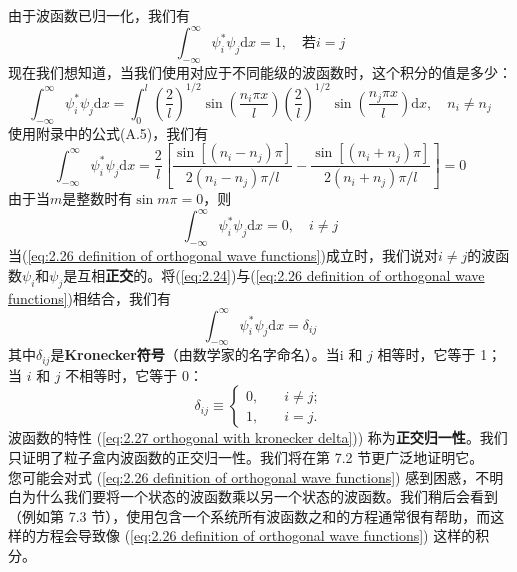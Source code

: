 	由于波函数已归一化，我们有
	\begin{equation}
		\int_{-\infty}^{\infty}\psi_i^{\ast} \psi_j \mathrm{d}x = 1, \quad \text{若}i=j
		\label{eq:2.24}
	\end{equation}
	现在我们想知道，当我们使用对应于不同能级的波函数时，这个积分的值是多少：
	\begin{equation*}
		\int_{-\infty}^{\infty}\psi_i^{\ast} \psi_j \mathrm{d}x = \int_{0}^{l}\left(\frac{2}{l}\right)^{1/2}\sin\left(\frac{n_i\pi x}{l}\right)\left(\frac{2}{l}\right)^{1/2}\sin\left(\frac{n_j\pi x}{l}\right)\mathrm{d}x, \quad n_i \neq n_j
	\end{equation*}
	使用附录中的公式(A.5)，我们有
	\begin{equation}
		\int_{-\infty}^{\infty}\psi_i^{\ast} \psi_j \mathrm{d}x = \frac{2}{l}\left[
			\frac{\sin \left[\left(n_i-n_j\right)\pi\right]}{2\left(n_i-n_j\right)\pi /l}- \frac{\sin \left[\left(n_i+n_j\right)\pi\right]}{2\left(n_i+n_j\right)\pi /l}
		\right] = 0
		\label{eq:2.25}
	\end{equation}
	由于当$m$是整数时有$\sin m \pi = 0$，则
	\begin{equation}
		\int_{-\infty}^{\infty}\psi_i^{\ast} \psi_j \mathrm{d}x = 0, \quad i \neq j
		\label{eq:2.26 definition of orthogonal wave functions}
	\end{equation}
	当(\ref{eq:2.26 definition of orthogonal wave functions})成立时，我们说对$i \neq j$的波函数$\psi_i$和$\psi_j$是互相\textbf{正交}的。将(\ref{eq:2.24})与(\ref{eq:2.26 definition of orthogonal wave functions})相结合，我们有
	\begin{equation}
		\int_{-\infty}^{\infty}\psi_i^{\ast} \psi_j \mathrm{d}x = \delta_{ij}
		\label{eq:2.27 orthogonal with kronecker delta}
	\end{equation}
	其中$\delta_{ij}$是\textbf{Kronecker符号}（由数学家的名字命名）。当$ $i 和 $j$ 相等时，它等于 1；当 $i$ 和 $j$ 不相等时，它等于 0：
	\begin{equation}
		\boxed{
			\delta_{ij} \equiv \begin{cases}
				0, \quad & i \neq j; \\
				1, \quad & i = j.
			\end{cases}
		}
		\label{eq:2.28 definition of kronecker delta}
	\end{equation}
	波函数的特性 (\ref{eq:2.27 orthogonal with kronecker delta})) 称为\textbf{正交归一性}。我们只证明了粒子盒内波函数的正交归一性。我们将在第 7.2 节更广泛地证明它。\\
	\indent 您可能会对式 (\ref{eq:2.26 definition of orthogonal wave functions}) 感到困惑，不明白为什么我们要将一个状态的波函数乘以另一个状态的波函数。我们稍后会看到（例如第 7.3 节），使用包含一个系统所有波函数之和的方程通常很有帮助，而这样的方程会导致像 (\ref{eq:2.26 definition of orthogonal wave functions}) 这样的积分。\\

